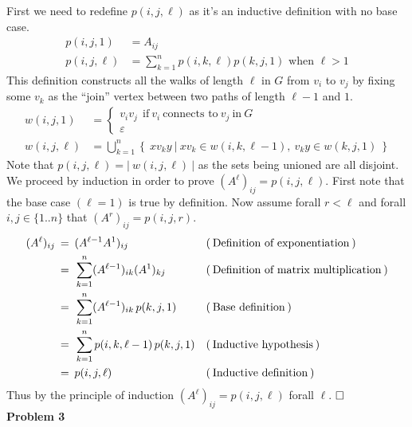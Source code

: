\documentclass[fleqn]{article}
\newcommand{\problem}[1]{\large\textbf{Problem #1}\normalsize}
\newcommand{\evidence}[1]{\ensuremath{(\hspace{0.2em} \text{#1} \hspace{0.2em})}}
\newcommand{\relation}[1]{\ensuremath{\hspace{0.2em} {{} #1 {}} \hspace{0.2em}}}
\newcommand{\equal}{\relation{=}}
\newcommand{\qed}{\hfill\ensuremath{\square}}
\begin{document}
First we need to redefine $p(i, j, \ell)$ as it's an inductive definition with no
base case.
\begin{align*}
  p(i, j, 1)    &= A_{ij} \\
  p(i, j, \ell) &= \sum_{k=1}^n p(i, k, \ell) p(k, j, 1) \text{ when } \ell > 1
\end{align*}
This definition constructs all the walks of length $\ell$ in $G$ from $v_i$ to
$v_j$ by fixing some $v_k$ as the ``join'' vertex between two paths of length
$\ell - 1$ and $1$.
\begin{align*}
  w(i, j, 1)    &=
    \begin{cases}
      v_iv_j \:\: \text{if} \: v_i \: \text{connects to} \: v_j \: \text{in} \: G \\
      \varepsilon
    \end{cases} \\
  w(i, j, \ell) &=
    \bigcup_{k=1}^n \left \{ \: xv_ky \: | \: xv_k \in w(i, k, \ell - 1), \: v_ky \in w(k, j, 1) \: \right \}
\end{align*}
Note that $p(i, j, \ell) = | \: w(i, j, \ell) \: |$ as the sets being unioned
are all disjoint. \\

We proceed by induction in order to prove $(A^{\ell})_{ij} = p(i,j,\ell)$. First
note that the base case $(\ell = 1)$ is true by definition. Now assume forall
$r < \ell$ and forall $i,j \in \{1 .. n\}$ that $(A^r)_{ij} = p(i,j,r)$.
\begin{align*}
  \displaystyle
  (A^{\ell})_{ij}
  {} &\equal (A^{\ell - 1}A^1)_{ij} && \evidence{Definition of exponentiation} \\
  {} &\equal \sum_{k=1}^n(A^{\ell - 1})_{ik}(A^1)_{kj} && \evidence{Definition of matrix multiplication} \\
  {} &\equal \sum_{k=1}^n(A^{\ell - 1})_{ik} \, p(k, j, 1) && \evidence{Base definition} \\
  {} &\equal \sum_{k=1}^np(i, k, \ell - 1) \, p(k, j, 1) && \evidence{Inductive hypothesis} \\
  {} &\equal p(i, j, \ell) && \evidence{Inductive definition}
\end{align*}
Thus by the principle of induction $(A^{\ell})_{ij} = p(i,j,\ell)$ forall
$\ell$. $\qed$ \\

\problem{3}
\end{document}
